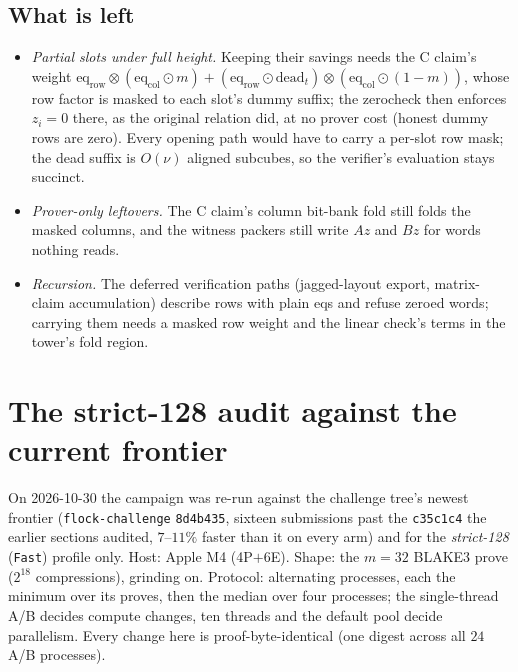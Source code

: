 \documentclass[11pt]{article}
\newcommand{\eq}{\mathrm{eq}}
\newcommand{\code}[1]{\texttt{#1}}
\begin{document}
\subsection{What is left}\label{sec:degreeone-left}

\begin{itemize}
\setlength{\itemsep}{1pt}
\item \emph{Partial slots under full height.} Keeping their savings needs
  the C claim's weight
  $\eq_{\mathrm{row}}\otimes(\eq_{\mathrm{col}}\odot m)
  + (\eq_{\mathrm{row}}\odot\mathrm{dead}_t)\otimes(\eq_{\mathrm{col}}\odot(1-m))$,
  whose row factor is masked to each slot's dummy suffix; the zerocheck
  then enforces $z_i = 0$ there, as the original relation did, at no
  prover cost (honest dummy rows are zero). Every opening path would have
  to carry a per-slot row mask; the dead suffix is $O(\nu)$ aligned
  subcubes, so the verifier's evaluation stays succinct.
\item \emph{Prover-only leftovers.} The C claim's column bit-bank fold
  still folds the masked columns, and the witness packers still write
  $A z$ and $B z$ for words nothing reads.
\item \emph{Recursion.} The deferred verification paths (jagged-layout
  export, matrix-claim accumulation) describe rows with plain eqs and
  refuse zeroed words; carrying them needs a masked row weight and the
  linear check's terms in the tower's fold region.
\end{itemize}

\section{The strict-128 audit against the current frontier}\label{sec:strict128}

On 2026-10-30 the campaign was re-run against the challenge tree's
newest frontier (\code{flock-challenge} \code{8d4b435}, sixteen
submissions past the \code{c35c1c4} the earlier sections audited,
$7$--$11\%$ faster than it on every arm) and for the \emph{strict-128}
(\code{Fast}) profile only. Host: Apple M4 (4P$+$6E). Shape: the $m{=}32$
BLAKE3 prove ($2^{18}$ compressions), grinding on. Protocol: alternating
processes, each the minimum over its proves, then the median over four
processes; the single-thread A/B decides compute changes, ten threads
and the default pool decide parallelism. Every change here is
proof-byte-identical (one digest across all $24$ A/B processes).
\end{document}
